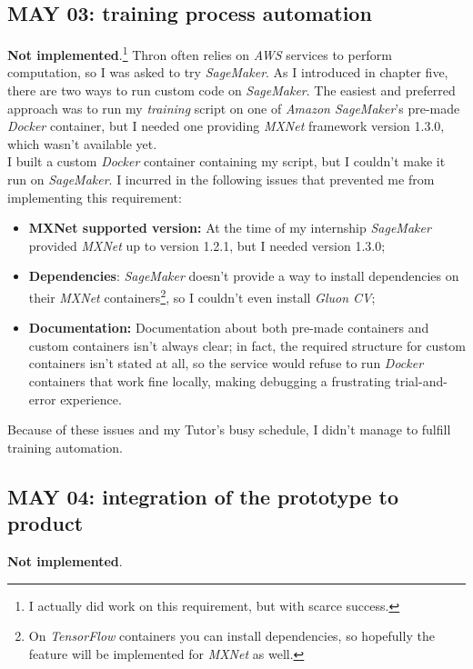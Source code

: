 \subsection{MAY 03: training process automation}
\textbf{Not implemented}.\footnote{I actually did work on this requirement, but with scarce success.} Thron often relies on \emph{AWS} services to perform computation, so I was asked to try \emph{SageMaker}. As I introduced in chapter five, there are two ways to run custom code on \emph{SageMaker}. The easiest and preferred approach was to run my \emph{training} script on one of \emph{Amazon SageMaker}'s pre-made \emph{Docker} container, but I needed one providing \emph{MXNet} framework version 1.3.0, which wasn't available yet. \\
I built a custom \emph{Docker} container containing my script, but I couldn't make it run on \emph{SageMaker}.
I incurred in the following issues that prevented me from implementing this requirement:
\begin{itemize}
	\item \textbf{MXNet supported version:} At the time of my internship \emph{SageMaker} provided \emph{MXNet} up to version 1.2.1, but I needed version 1.3.0;
	\item \textbf{Dependencies}: \emph{SageMaker} doesn't provide a way to install dependencies on their \emph{MXNet} containers\footnote{On \emph{TensorFlow} containers you can install dependencies, so hopefully the feature will be implemented for \emph{MXNet} as well.}, so I couldn't even install \emph{Gluon CV};
	\item \textbf{Documentation:} Documentation about both pre-made containers and custom containers isn't always clear; in fact, the required structure for custom containers isn't stated at all, so the service would refuse to run \emph{Docker} containers that work fine locally, making debugging a frustrating trial-and-error experience.
\end{itemize}
Because of these issues and my Tutor's busy schedule, I didn't manage to fulfill training automation.

\subsection{MAY 04: integration of the prototype to product}
\textbf{Not implemented}.
